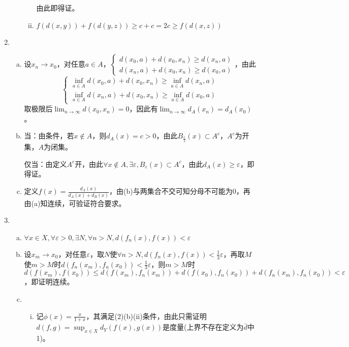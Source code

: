 \documentclass[a4paper,UTF8,fontset=windows]{ctexart}
\begin{document}
\begin{enumerate}[(1)]
\begin{enumerate}[(a)]
\begin{enumerate}[(i)]
    由此即得证。
    
    \item
    $f(d(x,y))+f(d(y,z))\ge c+c=2c\ge f(d(x,z))$
    \end{enumerate}
    \end{enumerate}
    
    \item
    \begin{enumerate}[(a)]
    \item
    设$x_n\to x_0$，对任意$a\in A$，$\begin{cases}d(x_0,a)+d(x_0,x_n)\ge d(x_n,a)\\d(x_n,a)+d(x_0,x_n)\ge d(x_0,a)\end{cases}$，由此
    \[\begin{cases}\inf_{a\in A}d(x_0,a)+d(x_0,x_n)\ge\inf_{a\in A}d(x_n,a)\\\inf_{a\in A}d(x_n,a)+d(x_0,x_n)\ge\inf_{a\in A}d(x_0,a)\end{cases}\]
    取极限后$\lim_{n\to\infty}d(x_0,x_n)=0$，因此有$\lim_{n\to\infty}d_A(x_n)=d_A(x_0)$。
    
    \item
    当：由条件，若$x\notin A$，则$d_A(x)=c>0$，由此$B_{\frac{c}{2}}(x)\subset A^c$，$A^c$为开集，$A$为闭集。
    
    仅当：由定义$A^c$开，由此$\forall x\notin A,\exists\varepsilon, B_\varepsilon(x)\subset A^c$，由此$d_A(x)\ge\varepsilon$，即得证。
    
    \item
    定义$f(x)=\frac{d_A(x)}{d_A(x)+d_B(x)}$，由(b)与两集合不交可知分母不可能为0，再由(a)知连续，可验证符合要求。 
    \end{enumerate}
    
    \item
    \begin{enumerate}[(a)]
    \item
    $\forall x\in X,\forall\varepsilon>0,\exists N,\forall n>N, d(f_n(x),f(x))<\varepsilon$
    
    \item
    设$x_m\to x_0$，对任意$\varepsilon$，取$N$使$\forall n>N, d(f_n(x),f(x))<\frac{1}{3}\varepsilon$，再取$M$使$m>M$时$d(f_n(x_m),f_n(x_0))<\frac{1}{3}\varepsilon$，则$m>M$时$d(f(x_m),f(x_0))\le d(f(x_m),f_n(x_m))+d(f(x_0),f_n(x_0))+d(f_n(x_m),f_n(x_0))<\varepsilon$，即证明连续。
    
    \item
    \begin{enumerate}[(i)]
    \item
    记$\phi(x)=\frac{x}{1+x}$，其满足(2)(b)(ii)条件，由此只需证明$d(f,g)=\sup_{x\in X}d_Y(f(x),g(x))$是度量(上界不存在定义为$\bar{d}$中1)。
    

\end{enumerate}
\end{enumerate}
\end{enumerate}
\end{document}
